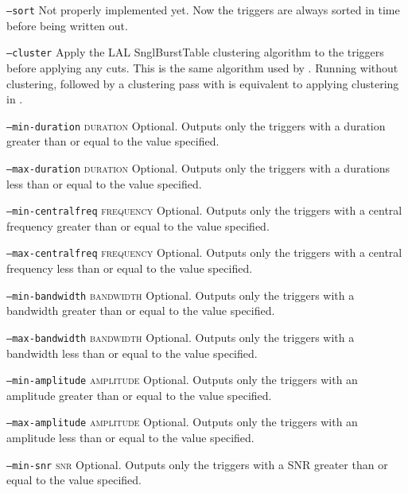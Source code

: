 \begin{entry}
\begin{entry}
\item[\texttt{--sort}]
Not properly implemented yet. Now the triggers are always sorted in time
before being written out.

\item[\texttt{--cluster}]
Apply the LAL SnglBurstTable clustering algorithm to the triggers before
applying any cuts.  This is the same algorithm used by
.  Running  without clustering,
followed by a clustering pass with  is equivalent to
applying clustering in .

\item[\texttt{--min-duration} \textsc{duration}]
Optional. Outputs only the triggers with a duration greater than or equal to the value specified.

\item[\texttt{--max-duration} \textsc{duration}]
Optional. Outputs only the triggers with a durations less than or equal to the value specified.

\item[\texttt{--min-centralfreq} \textsc{frequency}]
Optional. Outputs only the triggers with a central frequency greater than or equal to the value specified.

\item[\texttt{--max-centralfreq} \textsc{frequency}]
Optional. Outputs only the triggers with a central frequency less than or equal to the value specified.

\item[\texttt{--min-bandwidth} \textsc{bandwidth}]
Optional. Outputs only the triggers with a bandwidth greater than or equal to the value specified.

\item[\texttt{--max-bandwidth} \textsc{bandwidth}]
Optional. Outputs only the triggers with a bandwidth less than or equal to the value specified.

\item[\texttt{--min-amplitude} \textsc{amplitude}]
Optional. Outputs only the triggers with an amplitude greater than or equal to the value specified.

\item[\texttt{--max-amplitude} \textsc{amplitude}]
Optional. Outputs only the triggers with an amplitude less than or equal to the value specified.

\item[\texttt{--min-snr} \textsc{snr}]
Optional. Outputs only the triggers with a SNR greater than or equal to the value specified.


\end{entry}
\end{entry}
